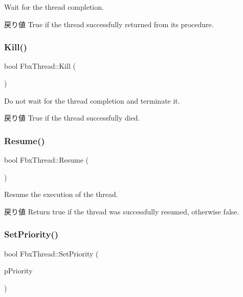 Wait for the thread completion. \begin{DoxyReturn}{戻り値}
True if the thread successfully returned from its procedure. 
\end{DoxyReturn}
\mbox{\label{class_fbx_thread_a24115ea67bd15a8181051693aef22ba1}} 
\subsubsection{\texorpdfstring{Kill()}{Kill()}}
{\footnotesize\ttfamily bool Fbx\+Thread\+::\+Kill (\begin{DoxyParamCaption}{ }\end{DoxyParamCaption})}

Do not wait for the thread completion and terminate it. \begin{DoxyReturn}{戻り値}
True if the thread successfully died. 
\end{DoxyReturn}
\mbox{\label{class_fbx_thread_a829e856a545af8ca53ac10241f5388fc}} 
\subsubsection{\texorpdfstring{Resume()}{Resume()}}
{\footnotesize\ttfamily bool Fbx\+Thread\+::\+Resume (\begin{DoxyParamCaption}{ }\end{DoxyParamCaption})}

Resume the execution of the thread. \begin{DoxyReturn}{戻り値}
Return true if the thread was successfully resumed, otherwise false. 
\end{DoxyReturn}
\mbox{\label{class_fbx_thread_a3aad216865d1009cd14bedfcd31bd79e}} 
\subsubsection{\texorpdfstring{Set\+Priority()}{SetPriority()}}
{\footnotesize\ttfamily bool Fbx\+Thread\+::\+Set\+Priority (\begin{DoxyParamCaption}\item[{\hyperlink{class_fbx_thread_a1b7d46235dd8589e03f7a29777f083f2}{E\+Priority}}]{p\+Priority }\end{DoxyParamCaption})}

